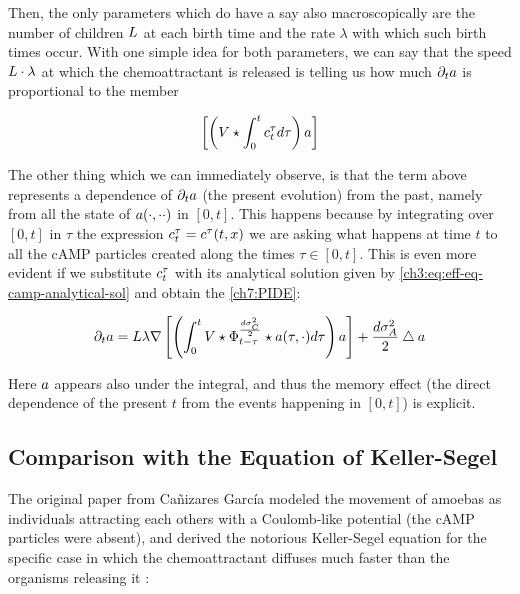 Then, the only parameters which do have a say also macroscopically are the number of children $L$ at each birth time and the rate $\lambda$ with which such birth times occur.
With one simple idea for both parameters, we can say that the speed $L \cdot \lambda$ at which the chemoattractant is released is telling us how much $\partial_t a$ is proportional to the member

\begin{equation*}
	\left[ \left( V
	\star \int_0^t c_t^\tau 	d \tau
	\right)
	a
	\right]
\end{equation*}

The other thing which we can immediately observe, is that the term above represents a dependence of $\partial_t a$ (the present evolution) from the past, namely from all the state of $a(\cdot,\cdot\cdot)$ in $[0,t]$.
This happens because by integrating over $[0,t]$ in $\tau$ the expression $c_t^\tau = c^\tau (t,x) $ we are asking what happens at time $t$ to all the cAMP particles created along the times $\tau\in[0,t]$.
This is even more evident if we substitute $c_t^\tau$ with its analytical solution given by \ref{ch3:eq:eff-eq-camp-analytical-sol} and obtain the \PIDE \ref{ch7:PIDE}:

\begin{equation*}
	\partial_t a =  L\lambda \nabla \left[ \left( \int_0^t
	V \star \Phi_{t-\tau}^{\frac{d\sigma_C^2}{2}} \star a(\tau, \cdot) 
	d \tau
	\right)
	a
	\right]
	+ \frac{d\sigma_A^2}{2} \bigtriangleup a
\end{equation*}

Here $a$ appears also under the integral, and thus the memory effect (the direct dependence of the present $t$ from the events happening in $[0,t]$) is explicit.

\subsection{Comparison with the Equation of Keller-Segel}

The original paper from Cañizares García \cite{ana} modeled the movement of amoebas as individuals attracting each others with a Coulomb-like potential (the cAMP particles were absent), and derived the notorious Keller-Segel equation \cite{keller-segel} for the specific case in which the chemoattractant diffuses much faster than the organisms releasing it \cite{jaeger-luckhaus}:

